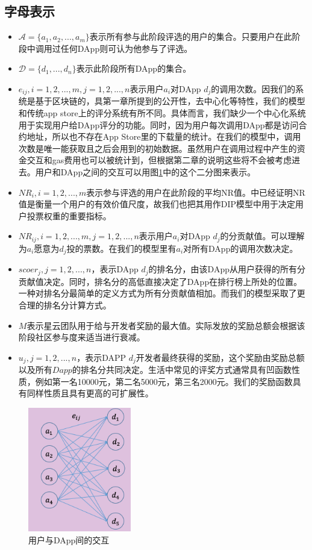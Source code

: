 \subsection{字母表示}
\begin{itemize}
	\item $\mathcal{A}=\{a_1,a_2,...,a_m\}$表示所有参与此阶段评选的用户的集合。只要用户在此阶段中调用过任何DApp则可认为他参与了评选。
	\item $\mathcal{D}=\{d_1,...,d_n\}$表示此阶段所有DApp的集合。
	\item $e_{ij},i=1,2,...,m, j=1,2,...,n$表示用户$a_i$对DApp $d_j$的调用次数。因我们的系统是基于区块链的，具第一章所提到的公开性，去中心化等特性，我们的模型和传统app store上的评分系统有所不同。具体而言，我们缺少一个中心化系统用于实现用户给DApp评分的功能。同时，因为用户每次调用DApp都是访问合约地址，所以也不存在App Store里的下载量的统计。在我们的模型中，调用次数是唯一能获取且之后会用到的初始数据。虽然用户在调用过程中产生的资金交互和gas费用也可以被统计到，但根据第二章的说明这些将不会被考虑进去。用户和DApp之间的交互可以用图\ref{fig:interact}中的这个二分图来表示。
	\item $NR_i, i=1,2,...,m$表示参与评选的用户在此阶段的平均NR值。\cite{Nabulasyellowpaper}中已经证明NR值是衡量一个用户的有效价值尺度，故我们也把其用作DIP模型中用于决定用户投票权重的重要指标。
	\item $NR_{ij}, i=1,2,...,m,j=1,2,...,n$表示用户$a_i$对DApp $d_j$的分贡献值。可以理解为$a_i$愿意为$d_j$投的票数。在我们的模型里有$a_i$对所有DApp的调用次数决定。
	\item $scoer_j, j=1,2,...,n$，表示DApp $d_j$的排名分，由该DApp从用户获得的所有分贡献值决定。同时，排名分的高低直接决定了DApp在排行榜上所处的位置。一种对排名分最简单的定义方式为所有分贡献值相加。而我们的模型采取了更合理的排名分计算方式。
	\item $M$表示星云团队用于给与开发者奖励的最大值。实际发放的奖励总额会根据该阶段社区参与度来适当进行衰减。
	\item $u_j, j=1,2,...,n$，表示DAPP $d_j$开发者最终获得的奖励，这个奖励由奖励总额以及所有$Dapp$的排名分共同决定。生活中常见的评奖方式通常具有凹函数性质，例如第一名10000元，第二名5000元，第三名2000元。我们的奖励函数具有同样性质且具有更高的可扩展性。
\end{itemize}
	 \begin{figure}
	 	\centering
	 	\includegraphics[width = 0.4\textwidth]{../common/m2.png}
	 	\caption{用户与DApp间的交互 \label{fig:interact}}
	 \end{figure}
